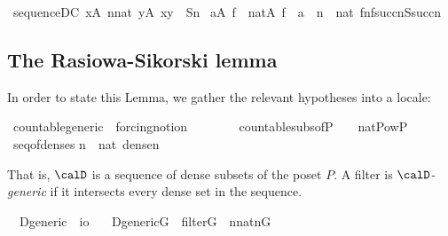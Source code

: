 \begin{isabelle}
\isamarkupfalse%
\ sequence{\isacharunderscore}DC{\isacharcolon}\ {\isachardoublequoteopen}{\isasymforall}x{\isasymin}A{\isachardot}\ {\isasymforall}n{\isasymin}nat{\isachardot}\ {\isasymexists}y{\isasymin}A{\isachardot}\ {\isasymlangle}x{\isacharcomma}y{\isasymrangle}\ {\isasymin}\ S{\isacharbackquote}n\ {\isasymLongrightarrow}\isanewline
 {\isasymforall}a{\isasymin}A{\isachardot}\ {\isacharparenleft}{\isasymexists}f\ {\isasymin}\ nat{\isasymrightarrow}A{\isachardot}\ f{\isacharbackquote}{}\ {\isacharequal}\ a\ {\isasymand}\ {\isacharparenleft}{\isasymforall}n\ {\isasymin}\ nat{\isachardot}\ {\isasymlangle}f{\isacharbackquote}n{\isacharcomma}f{\isacharbackquote}succ{\isacharparenleft}n{\isacharparenright}{\isasymrangle}{\isasymin}S{\isacharbackquote}succ{\isacharparenleft}n{\isacharparenright}{\isacharparenright}{\isacharparenright}{\isachardoublequoteclose}
\end{isabelle}

\subsection{The Rasiowa-Sikorski lemma}\label{sec:rasiowa-sikorski-lemma}
In order to state this Lemma, we gather the relevant hypotheses into a locale:

\begin{isabelle}%
\isamarkupfalse%
\ countable{\isacharunderscore}generic\ {\isacharequal}\ forcing{\isacharunderscore}notion\ {\isacharplus}\isanewline
\ \ \ {\isasymD}\isanewline
\ \ \ countable{\isacharunderscore}subs{\isacharunderscore}of{\isacharunderscore}P{\isacharcolon}\ \ {\isachardoublequoteopen}{\isasymD}\ {\isasymin}\ nat{\isasymrightarrow}Pow{\isacharparenleft}P{\isacharparenright}{\isachardoublequoteclose}\isanewline
\ \  \ seq{\isacharunderscore}of{\isacharunderscore}denses{\isacharcolon}  {\isachardoublequoteopen}{\isasymforall}n\ {\isasymin}\ nat{\isachardot}\ dense{\isacharparenleft}{\isasymD}{\isacharbackquote}n{\isacharparenright}{\isachardoublequoteclose}
\end{isabelle}
%
That is, $\calD$ is a sequence of dense subsets of the poset $P$. A
filter is \emph{$\calD$-generic} if it intersects every dense set in
the sequence.

\begin{isabelle}%
\isamarkupfalse%
\ \ D{\isacharunderscore}generic\ {\isacharcolon}{\isacharcolon}\ {\isachardoublequoteopen}i{\isasymRightarrow}o{\isachardoublequoteclose}\ \isanewline
\ \ {\isachardoublequoteopen}D{\isacharunderscore}generic{\isacharparenleft}G{\isacharparenright}\ {\isacharequal}{\isacharequal}\ filter{\isacharparenleft}G{\isacharparenright}\ {\isasymand}\ {\isacharparenleft}{\isasymforall}n{\isasymin}nat{\isachardot}{\isacharparenleft}{\isasymD}{\isacharbackquote}n{\isacharparenright}{\isasyminter}G{\isasymnoteq}{}{\isacharparenright}{\isachardoublequoteclose}
\end{isabelle}


